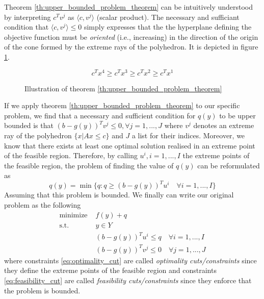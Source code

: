 Theorem \ref{th:upper_bounded_problem_theorem} can be intuitively understood by interpreting $c^Tv^j$ as $\langle c, v^j\rangle$ (scalar product). The necessary and sufficiant condition that $\langle c, v^j\rangle\le 0$ simply expresses that the the hyperplane defining the objective function must be \textit{oriented} (i.e., increasing) in the direction of the origin of the cone formed by the extreme rays of the polyhedron. It is depicted in figure \ref{fig:upper_bounded_problem}.

\begin{figure}[h!]
    \centering
    \[ c^Tx^4 \ge c^Tx^3\ge c^Tx^2 \ge c^Tx^1 \]
    \caption{Illustration of theorem \ref{th:upper_bounded_problem_theorem}}
    \label{fig:upper_bounded_problem}
\end{figure}

If we apply theorem \ref{th:upper_bounded_problem_theorem} to our specific problem, we find that a necessary and sufficient condition for $q(y)$ to be upper bounded is that $(b-g(y))^Tv^j\le 0, \forall j=1,...,J$ where $v^j$ denotes an extreme ray of the polyhedron $\{x|Ax\le c\}$ and $J$ a list for their indices. Moreover, we know that there exists at least one optimal solution realised in an extreme point of the feasible region. Therefore, by calling $u^i, i=1,...,I$ the extreme points of the feasible region, the problem of finding the value of $q(y)$ can be reformulated as \[ q(y) = \min\{ q : q \ge (b-g(y))^Tu^i\quad\forall i=1,...,I \} \] Assuming that this problem is bounded. We finally can write our original problem as the following
\begin{align}
    \textrm{minimize } & f(y) + q\\
    \textrm{s.t. } & y\in Y\\
    & (b-g(y))^Tu^i \le q\quad\forall i=1,...,I \label{eq:optimality_cut}\\
    & (b-g(y))^Tv^j \le 0\quad\forall j=1,...,J \label{eq:feasibility_cut}
\end{align} where constraints \ref{eq:optimality_cut} are called \textit{optimality cuts/constraints} since they define the extreme points of the feasible region and constraints \ref{eq:feasibility_cut} are called \textit{feasibility cuts/constraints} since they enforce that the problem is bounded. 

